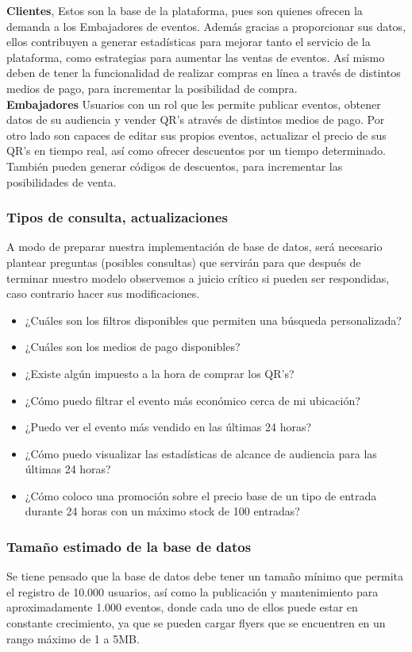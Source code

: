 \textbf{Clientes}, Estos son la base de la plataforma, pues son quienes ofrecen la demanda a los Embajadores de eventos. Además gracias a proporcionar sus datos, ellos contribuyen a generar estadísticas para mejorar tanto el servicio de la plataforma, como estrategias para aumentar las ventas de eventos. Así mismo deben de tener la funcionalidad de realizar compras en línea a través de distintos medios de pago, para incrementar la posibilidad de compra.\\

\textbf{Embajadores} Usuarios con un rol que les permite publicar eventos, obtener datos de su audiencia y vender QR's através de distintos medios de pago. Por otro lado son capaces de editar sus propios eventos, actualizar el precio de sus QR's en tiempo real, así como ofrecer descuentos por un tiempo determinado. También pueden generar códigos de descuentos, para incrementar las posibilidades de venta.\\

\subsubsection{Tipos de consulta, actualizaciones}
A modo de preparar nuestra implementación de base de datos, será necesario plantear preguntas (posibles consultas) que servirán para que después de terminar nuestro modelo observemos a juicio crítico si pueden ser respondidas, caso contrario hacer sus modificaciones.
\begin{itemize}
    \item ¿Cuáles son los filtros disponibles que permiten una búsqueda personalizada?
    \item ¿Cuáles son los medios de pago disponibles?
    \item ¿Existe algún impuesto a la hora de comprar los QR's?
    \item ¿Cómo puedo filtrar el evento más económico cerca de mi ubicación?
    \item ¿Puedo ver el evento más vendido en las últimas 24 horas?
    \item ¿Cómo puedo visualizar las estadísticas de alcance de audiencia para las últimas 24 horas?
    \item ¿Cómo coloco una promoción sobre el precio base de un tipo de entrada durante 24 horas con un máximo stock de 100 entradas?\\
\end{itemize}

\subsubsection{Tamaño estimado de la base de datos}
Se tiene pensado que la base de datos debe tener un tamaño mínimo que permita el registro de 10.000 usuarios, así como la publicación y mantenimiento para aproximadamente 1.000 eventos, donde cada uno de ellos puede estar en constante crecimiento, ya que se pueden cargar flyers que se encuentren en un rango máximo de 1 a 5MB.\\


